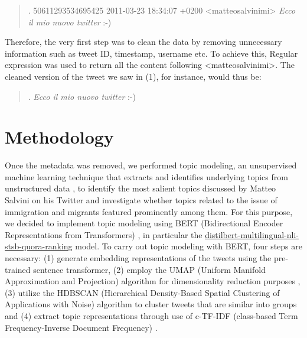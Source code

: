 \documentclass[11pt]{article}
\begin{document}
\begin{quote}
\ex. 50611293534695425 2011-03-23 18:34:07 +0200 <matteosalvinimi> \textit{Ecco il mio nuovo twitter} :-)
\end{quote}

Therefore, the very first step was to clean the data by removing unnecessary information such as tweet ID, timestamp, username etc. To achieve this, Regular expression \citep{aho1991algorithms}  was used to return all the content following <matteosalvinimi>. 
The cleaned version of the tweet we saw in (1), for instance, would thus be:

\begin{quote}
\ex. \textit{Ecco il mio nuovo twitter} :-)
\end{quote}

\section{Methodology}

Once the metadata was removed, we performed topic modeling, an unsupervised machine learning technique that extracts and identifies underlying topics from unstructured data \citep{blei2012probabilistic}, to identify the most salient topics discussed by Matteo Salvini on his Twitter and investigate whether topics related to the issue of immigration and migrants featured prominently among them. 
For this purpose, we decided to implement topic modeling using BERT (Bidirectional Encoder Representations from Transformers) \citep{devlin2018bert}, in particular the \href{https://huggingface.co/sentence-transformers/distilbert-multilingual-nli-stsb-quora-ranking}{distilbert-multilingual-nli-stsb-quora-ranking} model. To carry out topic modeling with BERT, four steps are necessary: (1) generate embedding representations of the tweets using the pre-trained sentence transformer, (2) employ the UMAP (Uniform Manifold Approximation and Projection) algorithm for dimensionality reduction purposes \citep{mcinnes2018umap}, (3) utilize the HDBSCAN (Hierarchical Density-Based Spatial Clustering of Applications with Noise) algorithm to cluster tweets that are similar into groups \citep{mcinnes2017hdbscan} and (4) extract topic representations through use of c-TF-IDF (class-based Term Frequency-Inverse Document Frequency) \citep{joachims1997probabilistic}.
\end{document}
